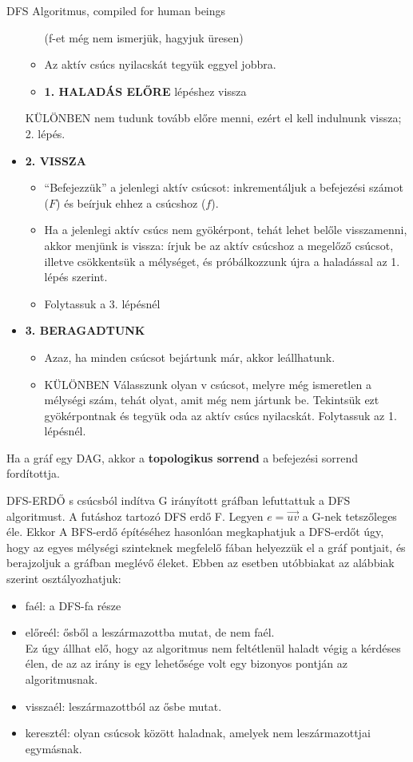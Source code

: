 \begin{tetel}{DFS Algoritmus, compiled for human beings}
\begin{itemize}
\begin{itemize}
    (f-et még nem ismerjük, hagyjuk üresen)

  \item Az aktív csúcs nyilacskát tegyük eggyel jobbra.

	\item \textbf{1. HALADÁS ELŐRE} lépéshez vissza
	\end{itemize}
    KÜLÖNBEN nem tudunk tovább előre menni, ezért el kell indulnunk vissza; 2. lépés.
\item{\textbf{2. VISSZA}}
  \begin{itemize}
  \item ``Befejezzük'' a jelenlegi aktív csúcsot: inkrementáljuk a befejezési számot ($F$) és beírjuk ehhez a csúcshoz ($f$).
  \item Ha a jelenlegi aktív csúcs nem gyökérpont, tehát lehet belőle visszamenni, akkor menjünk is vissza: írjuk be az aktív csúcshoz a megelőző csúcsot, illetve csökkentsük a mélységet, és próbálkozzunk újra a haladással az 1. lépés szerint.
  \item Folytassuk a 3. lépésnél
  \end{itemize}
\item \textbf{3. BERAGADTUNK}
  \begin{itemize}
  \item Azaz, ha minden csúcsot bejártunk már, akkor leállhatunk.
  \item KÜLÖNBEN Válasszunk olyan v csúcsot, melyre még ismeretlen a mélységi szám, tehát olyat, amit még nem jártunk be. Tekintsük ezt gyökérpontnak és tegyük oda az aktív csúcs nyilacskát. Folytassuk az 1. lépésnél.
  \end{itemize}
\end{itemize}

Ha a gráf egy DAG, akkor a \textbf{topologikus sorrend} a befejezési sorrend fordítottja.
\end{tetel}

\begin{definicio}{DFS-ERDŐ}
s csúcsból indítva G irányított gráfban lefuttattuk a DFS algoritmust. A futáshoz tartozó DFS erdő F. Legyen $e=\overrightarrow{uv}$ a G-nek tetszőleges éle. Ekkor
A BFS-erdő építéséhez hasonlóan megkaphatjuk a DFS-erdőt úgy, hogy az egyes mélységi szinteknek megfelelő fában helyezzük el a gráf pontjait, és berajzoljuk a gráfban meglévő éleket. Ebben az esetben utóbbiakat az alábbiak szerint osztályozhatjuk:
\begin{itemize}
\item faél: a DFS-fa része
\item előreél: ősből a leszármazottba mutat, de nem faél.\\
  Ez úgy állhat elő, hogy az algoritmus nem feltétlenül haladt végig a kérdéses élen, de az az irány is egy lehetősége volt egy bizonyos pontján az algoritmusnak.
\item visszaél: leszármazottból az ősbe mutat.
\item keresztél: olyan csúcsok között haladnak, amelyek nem leszármazottjai egymásnak.
\end{itemize}
\end{definicio}

